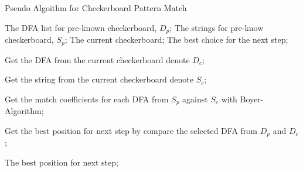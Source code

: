 \documentclass{article}
\begin{document}
\begin{algorithm}[htb]
  \caption{ Pseudo Algoithm for Checkerboard Pattern Match}
  \label{pm}
  \begin{algorithmic}[1]
    \Require
      The DFA list for pre-known checkerboard, $D_p$;
      The strings for pre-know checkerboard, $S_p$;
      The current checkerboard;
    \Ensure
      The best choice for the next step;
      
    \State Get the DFA from the current checkerboard denote $D_c$;
    \label{pm:c:dfa}
    
    \State Get the string from the current checkerboard denote $S_c$;
    \label{pm:c:string}
    
    \State Get the match coefficients for each DFA from $S_p$ against $S_c$ with Boyer- Algorithm;
    \label{pm:c:mc}
    
    \State Get the best position for next step by compare the selected DFA from $D_p$ 
    and $D_c$;\\
    \label{pm:c:res}
    
    \Return The best position for next step;
  \end{algorithmic}
\end{algorithm}
\end{document}
